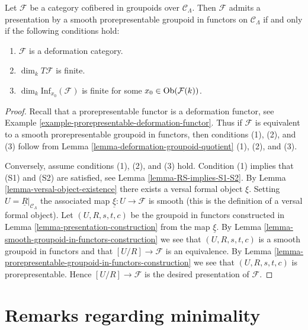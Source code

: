 \begin{theorem}
\label{theorem-presentation-deformation-groupoid}
Let $\mathcal{F}$ be a category cofibered in groupoids over
$\mathcal{C}_\Lambda$. Then $\mathcal{F}$ admits a presentation by a
smooth prorepresentable groupoid in functors on $\mathcal{C}_\Lambda$
if and only if the following conditions hold:
\begin{enumerate}
\item $\mathcal{F}$ is a deformation category.
\item $\dim_k T\mathcal{F}$ is finite.
\item $\dim_k \text{Inf}_{x_0}(\mathcal{F})$ is finite for some
$x_0 \in \mathop{\rm Ob}\nolimits(\mathcal{F}(k))$.
\end{enumerate}
\end{theorem}

\begin{proof}
Recall that a prorepresentable functor is a deformation functor, see
Example \ref{example-prorepresentable-deformation-functor}. Thus
if $\mathcal{F}$ is equivalent to a smooth prorepresentable groupoid in
functors, then conditions (1), (2), and (3) follow from
Lemma \ref{lemma-deformation-groupoid-quotient} (1), (2), and (3).

\medskip\noindent
Conversely, assume conditions (1), (2), and (3) hold. Condition (1)
implies that (S1) and (S2) are satisfied, see
Lemma \ref{lemma-RS-implies-S1-S2}.
By
Lemma \ref{lemma-versal-object-existence}
there exists a versal formal object $\xi$. Setting
$U = \underline{R}|_{\mathcal{C}_\Lambda}$ the
associated map $\underline{\xi} : U \to \mathcal{F}$ is smooth (this is
the definition of a versal formal object).
Let $(U, R, s, t, c)$ be the groupoid in functors constructed in
Lemma \ref{lemma-presentation-construction}
from the map $\underline{\xi}$. By
Lemma \ref{lemma-smooth-groupoid-in-functors-construction}
we see that $(U, R, s, t, c)$ is a smooth groupoid in functors and that
$[U/R] \to \mathcal{F}$ is an equivalence. By
Lemma \ref{lemma-prorepresentable-groupoid-in-functors-construction}
we see that $(U, R, s, t, c)$ is prorepresentable.
Hence $[U/R] \to \mathcal{F}$ is the desired presentation of $\mathcal{F}$.
\end{proof}








\section{Remarks regarding minimality}
\label{section-minimality}

